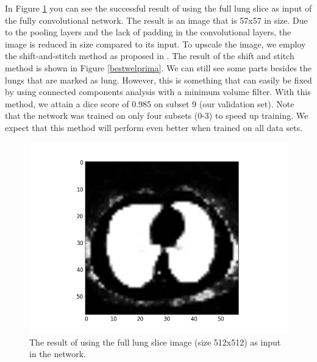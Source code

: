 \documentclass{article}
\begin{document}
In Figure \ref{bestwellon} you can see the successful result of using the full lung slice as input of the fully convolutional network. The result is an image that is 57x57 in size. Due to the pooling layers and the lack of padding in the convolutional layers, the image is reduced in size compared to its input. To upscale the image, we employ the shift-and-stitch method as proposed in \cite{long}. The result of the shift and stitch method is shown in Figure \ref{bestwelprima}. We can still see some parts besides the lungs that are marked as lung. However, this is something that can easily be fixed by using connected components analysis with a minimum volume filter. With this method, we attain a dice score of 0.985 on subset 9 (our validation set). Note that the network was trained on only four subsets (0-3) to speed up training. We expect that this method will perform even better when trained on all data sets.

\begin{figure}
    \centering
    \includegraphics[width=\linewidth]{best_wel_lon.png}
    \caption{The result of using the full lung slice image (size 512x512) as input in the network.}
    \label{bestwellon}
\end{figure}
\end{document}
